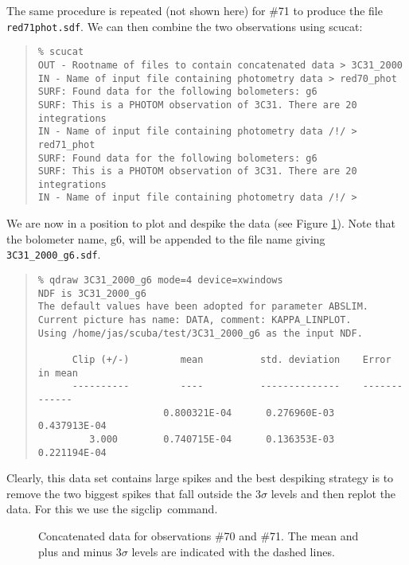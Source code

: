 \documentclass[twoside,11pt,fleqn]{article}
\newenvironment{myquote}{\begin{quote}\begin{small}}{\end{small}\end{quote}}
\newcommand{\task}[1]{{\sf #1}}
\newcommand{\scucat}{\xref{\task{scucat}}{sun216}{SCUCAT}}
\newcommand{\sigclip}{\xref{\task{sigclip}}{sun216}{SIGCLIP}}
\newcommand{\xref}[3]{#1}
\begin{document}
The same procedure is repeated (not shown here) for \#71 to produce
the file {\tt red71phot.sdf}. We can then combine the two observations
using \scucat:

\begin{myquote}
\begin{verbatim}
% scucat
OUT - Rootname of files to contain concatenated data > 3C31_2000
IN - Name of input file containing photometry data > red70_phot
SURF: Found data for the following bolometers: g6
SURF: This is a PHOTOM observation of 3C31. There are 20 integrations
IN - Name of input file containing photometry data /!/ > red71_phot
SURF: Found data for the following bolometers: g6
SURF: This is a PHOTOM observation of 3C31. There are 20 integrations
IN - Name of input file containing photometry data /!/ >
\end{verbatim}
\end{myquote}

We are now in a position to plot and despike the data (see Figure
\ref{f1}). Note that the bolometer name, g6, will be appended to the file
name giving {\tt 3C31\_2000\_g6.sdf}.

\begin{myquote}
\begin{verbatim}
% qdraw 3C31_2000_g6 mode=4 device=xwindows
NDF is 3C31_2000_g6
The default values have been adopted for parameter ABSLIM.
Current picture has name: DATA, comment: KAPPA_LINPLOT.
Using /home/jas/scuba/test/3C31_2000_g6 as the input NDF.

      Clip (+/-)         mean          std. deviation    Error in mean
      ----------         ----          --------------    -------------
                      0.800321E-04      0.276960E-03      0.437913E-04
         3.000        0.740715E-04      0.136353E-03      0.221194E-04
\end{verbatim}
\end{myquote}

Clearly, this data set contains large spikes and the best despiking
strategy is to remove the two biggest spikes that fall outside the
3$\sigma$ levels and then replot the data. For this we use the
\sigclip\ command.

\begin{figure}
\caption{Concatenated data for observations \#70 and \#71. The
mean and plus and minus 3$\sigma$ levels are indicated with the dashed
lines.}
\label{f1}
\end{figure}
\end{document}

